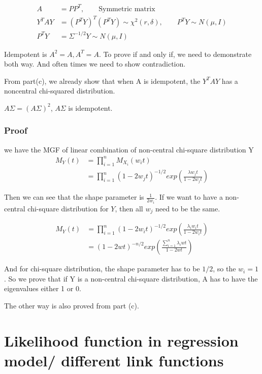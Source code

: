 \documentclass[11pt]{article} %
\begin{document}
\begin{align*}
	A & = P P^T, \qquad \text{Symmetric matrix}\\
	Y^T A Y &=  (P^T Y)^T (P^T Y) \sim \chi^2(r, \delta), \qquad P^T Y \sim N(\mu, I)\\
	P^T Y &= \Sigma^{-1/2} Y \sim N(\mu, I)
\end{align*}


Idempotent is $A^2 = A, A^T = A$. 
To prove if and only if, we need to demonstrate both way. And often times we need to show contradiction.

From part(c), we already show that when A is idempotent, the $Y^T A Y$ has a noncentral chi-squared distribution. 

$A \Sigma = (A \Sigma)^2$, $A \Sigma$ is idempotent. 

\subsubsection{Proof}

we have the MGF of linear combination of non-central chi-square distribution Y
\begin{align*}
	M_Y(t) &= \prod_{i=1}^n M_{X_i}(w_i t)\\
	&=\prod_{i=1}^n  (1-2 w_jt)^{-1/2} exp \left( \frac{ \lambda w_j t }{1-2 w_j t} \right)
\end{align*}

Then we can see that the shape parameter is $\frac{1}{2 w_i}$. If we want to have a non-central chi-square distribution for $Y$, then all $w_j$ need to be the same. 

\begin{align*}
	M_Y(t) &= \prod_{i=1}^n  (1-2 w_i t)^{-1/2} exp \left( \frac{ \lambda_i w_i t }{1-2 w_i t} \right) \\
	&= (1-2 wt)^{-n/2} exp \left( \frac{ \sum_{i=1}^n\lambda_i w t }{1-2 w t} \right) 
\end{align*}

And for chi-square distribution, the shape parameter has to be $1/2$, so the $w_i = 1$. So we prove that if Y is a non-central chi-square distribution, A has to have the eigenvalues either 1 or 0. 

The other way is also proved from part (c). 


	\section{Likelihood function in regression model/ different link functions}
	
\end{document}
